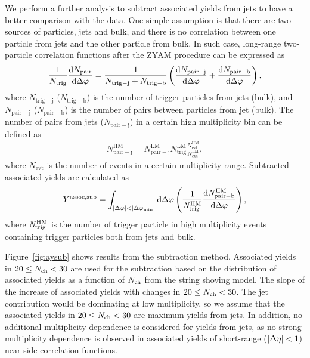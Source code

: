 We perform a further analysis to subtract associated yields from jets to have a better comparison with the data.
One simple assumption is that there are two sources of particles, jets and bulk, and there is no correlation between one particle from jets and the other particle from bulk. In such case, long-range two-particle correlation functions after the ZYAM procedure can be expressed as
\begin{align}
    \frac{1}{N_\mathrm{trig}} \frac{\mathrm{d} N_\mathrm{pair}}{\mathrm{d} \mbox{$\Delta\varphi$}} = \frac{1}{N_\mathrm{trig-j} + N_\mathrm{trig-b}} \left( \frac{\mathrm{d} N_\mathrm{pair-j}}{\mathrm{d} \Delta \varphi} + \frac{\mathrm{d} N_\mathrm{pair-b}}{\mathrm{d} \Delta \varphi} \right),
\end{align}
where $N_\mathrm{trig-j}$ ($N_\mathrm{trig-b}$) is the number of trigger particles from jets (bulk), and $N_\mathrm{pair-j}$ ($N_\mathrm{pair-b}$) is the number of pairs between particles from jet (bulk).
The number of pairs from jets ($N_\mathrm{pair-j}$) in a certain high multiplicity bin can be defined as
\begin{align}
    N_\mathrm{pair-j}^\mathrm{HM} = N_\mathrm{pair-j}^\mathrm{LM} N_\mathrm{trig}^\mathrm{LM} \frac{N_\mathrm{evt}^\mathrm{HM}}{N_\mathrm{evt}^\mathrm{LM}},
\end{align}
where $N_\mathrm{evt}$ is the number of events in a certain multiplicity range.
Subtracted associated yields are calculated as
\begin{equation}
   Y^\mathrm{assoc,sub} = \int_{|\Delta \varphi| < |\Delta \varphi_{\mathrm{min}}| } \mathrm{d} \Delta\varphi \left( \frac{1}{\it{N}_{\rm{trig}}^\mathrm{HM}} \frac{ \rm{d}\it{}N_{\rm{pair-b}}^\mathrm{HM} }{ \mathrm{d}\Delta\varphi } \right), 
\end{equation}
where $\it{N}_{\rm{trig}}^\mathrm{HM}$ is the number of trigger particle in high multiplicity events containing trigger particles both from jets and bulk.

Figure~\ref{fig:aysub} shows results from the subtraction method.
Associated yields in $20\leq\mbox{$N_\mathrm{ch}$}<30$ are used for the subtraction based on the distribution of associated yields as a function of $\mbox{$N_\mathrm{ch}$}$ from the string shoving model.
The slope of the increase of associated yields with \Nch changes in $20\leq\mbox{$N_\mathrm{ch}$}<30$.
The jet contribution would be dominating at low multiplicity, so we assume that the associated yields in $20\leq\mbox{$N_\mathrm{ch}$}<30$ are maximum yields from jets.
In addition, no additional multiplicity dependence is considered for yields from jets, as no strong multiplicity dependence is observed in associated yields of short-range ($|\mbox{$\Delta\eta$}|<1$) near-side correlation functions.

